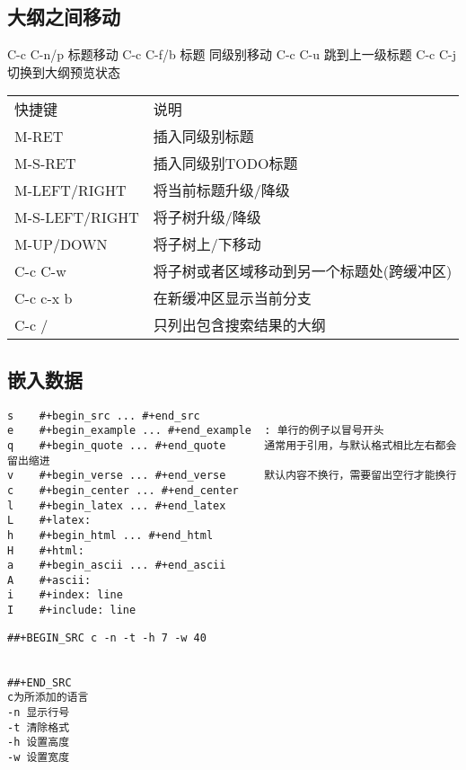 \documentclass[11pt]{article}
\begin{document}
\subsection{大纲之间移动}
\label{sec-6-3}

C-c C-n/p  标题移动
C-c C-f/b  标题 同级别移动
C-c C-u    跳到上一级标题
C-c C-j    切换到大纲预览状态


\begin{center}
\begin{tabular}{ll}
 快捷键          &  说明                                        \\
 M-RET           &  插入同级别标题                              \\
 M-S-RET         &  插入同级别TODO标题                          \\
 M-LEFT/RIGHT    &  将当前标题升级/降级                         \\
 M-S-LEFT/RIGHT  &  将子树升级/降级                             \\
 M-UP/DOWN       &  将子树上/下移动                             \\
 C-c C-w         &  将子树或者区域移动到另一个标题处(跨缓冲区)  \\
 C-c c-x b       &  在新缓冲区显示当前分支                      \\
 C-c /           &  只列出包含搜索结果的大纲                    \\
\end{tabular}
\end{center}
\subsection{嵌入数据}
\label{sec-6-4}



\begin{verbatim}
s    #+begin_src ... #+end_src 
e    #+begin_example ... #+end_example  : 单行的例子以冒号开头
q    #+begin_quote ... #+end_quote      通常用于引用，与默认格式相比左右都会留出缩进
v    #+begin_verse ... #+end_verse      默认内容不换行，需要留出空行才能换行
c    #+begin_center ... #+end_center 
l    #+begin_latex ... #+end_latex 
L    #+latex: 
h    #+begin_html ... #+end_html 
H    #+html: 
a    #+begin_ascii ... #+end_ascii 
A    #+ascii: 
i    #+index: line 
I    #+include: line
\end{verbatim}


\begin{verbatim}
##+BEGIN_SRC c -n -t -h 7 -w 40


##+END_SRC
c为所添加的语言
-n 显示行号
-t 清除格式
-h 设置高度
-w 设置宽度
\end{verbatim}
\end{document}
